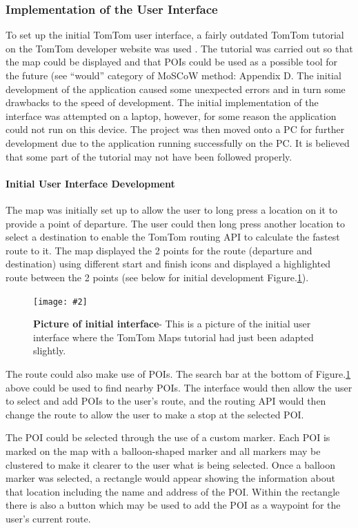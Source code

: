 \documentclass[12pt,a4paper]{article}
\newcommand{\figuremacro}[5]{
    \begin{figure}[#1]
        \centering
        \texttt{[image: \#2]}
        \caption[#3]{\textbf{#3}#4}
        \label{fig:#2}
    \end{figure}
}
\begin{document}
\subsubsection{Implementation of the User Interface}
To set up the initial TomTom user interface, a fairly outdated TomTom tutorial on the TomTom developer website was used \cite{TomTomTut}. The tutorial was carried out so that the map could be displayed and that POIs could be used as a possible tool for the future (see \enquote{would} category of MoSCoW method: Appendix D. The initial development of the application caused some unexpected errors and in turn some drawbacks to the speed of development. The initial implementation of the interface was attempted on a laptop, however, for some reason the application could not run on this device. The project was then moved onto a PC for further development due to the application running successfully on the PC. It is believed that some part of the tutorial may not have been followed properly.

\newpage
\paragraph{Initial User Interface Development}

 The map was initially set up to allow the user to long press a location on it to provide a point of departure. The user could then long press another location to select a destination to enable the TomTom routing API to calculate the fastest route to it. The map displayed the 2 points for the route (departure and destination) using different start and finish icons and displayed a highlighted route between the 2 points (see below for initial development Figure.\ref{fig:initialInterface}). 
 
  \figuremacro{h}{initialInterface}{Picture of initial interface}{- This is a picture of the initial user interface where the TomTom Maps tutorial had just been adapted slightly.}{0.4}
 
 The route could also make use of POIs. The search bar at the bottom of Figure.\ref{fig:initialInterface} above could be used to find nearby POIs. The interface would then allow the user to select and add POIs to the user's route, and the routing API would then change the route to allow the user to make a stop at the selected POI.

 The POI could be selected through the use of a custom marker. Each POI is marked on the map with a balloon-shaped marker and all markers may be clustered to make it clearer to the user what is being selected. Once a balloon marker was selected, a rectangle would appear showing the information about that location including the name and address of the POI. Within the rectangle there is also a button which may be used to add the POI as a waypoint for the user's current route.
\end{document}
